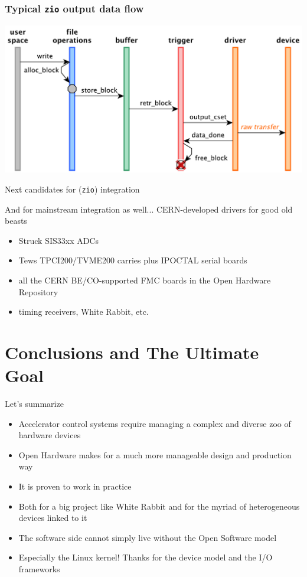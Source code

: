 \documentclass[compress,red]{beamer}
\begin{document}
\begin{frame}
\frametitle{Typical \texttt{zio} output data flow}
\includegraphics[height=0.8\textheight]{flow-temp-out.pdf}
\end{frame}

\begin{frame}{Next candidates for (\texttt{zio}) integration}

And for mainstream integration as well...
\pause
CERN-developed drivers for good old beasts
\begin{itemize}
\pause
\item Struck SIS33xx ADCs
\pause
\item Tews TPCI200/TVME200 carries plus IPOCTAL serial boards
\pause
\item all the CERN BE/CO-supported FMC boards in the Open Hardware Repository
\pause
\item timing receivers, White Rabbit, etc.
\end{itemize}
\end{frame}

\section{Conclusions and The Ultimate Goal}

\begin{frame}{Let's summarize}

\begin{itemize}
\pause
\item Accelerator control systems require managing a complex and
    diverse zoo of hardware devices
\pause
\item Open Hardware makes for a much more manageable design and 
    production way
\pause
\item It is proven to work in practice
\pause
\item Both for a big project like White Rabbit and for the myriad
    of heterogeneous devices linked to it
\pause
\item The software side cannot simply live without the Open Software
    model
\pause
\item Especially the Linux kernel! Thanks for the device model and
    the I/O frameworks
\end{itemize}
\end{frame}
\end{document}
